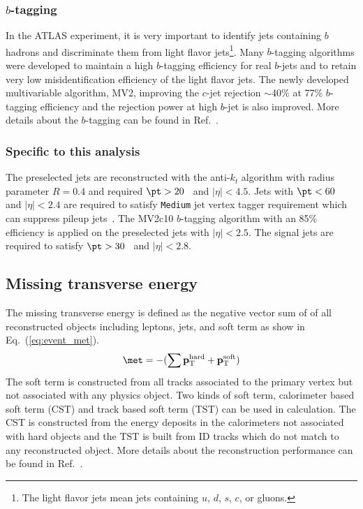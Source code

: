 
\subsubsection{$b$-tagging}
\label{subsubsec:event_bjets}
In the ATLAS experiment, it is very important to identify jets containing $b$ hadrons and discriminate them from light flavor jets\footnote{The light flavor jets mean jets containing $u$, $d$, $s$, $c$, or gluons.}.
Many $b$-tagging algorithms were developed to maintain a high $b$-tagging efficiency for real $b$-jets and to retain very low misidentification efficiency of the light flavor jets.
The newly developed multivariable algorithm, MV2, improving the $c$-jet rejection $\sim$40\% at 77\% $b$-tagging efficiency and the rejection power at high $b$-jet \pt is also improved.
More details about the $b$-tagging can be found in Ref.~\cite{ATL-PHYS-PUB-2015-022, ATL-PHYS-PUB-2016-012}.


\subsubsection{Specific to this analysis}
\label{subsubsec:event_jets_specific}
The preselected jets are reconstructed with the anti-$k_{t}$ algorithm with radius parameter $R = 0.4$ and required $\pt > 20$~{\GeV} and $|\eta| < 4.5$.
Jets with $\pt < 60$~{\GeV} and $|\eta| < 2.4$ are required to satisfy \texttt{Medium} jet vertex tagger requirement which can suppress pileup jets~\cite{Aad:2015ina}.
The MV2c10 $b$-tagging algorithm with an 85\% efficiency is applied on the preselected jets with $|\eta| < 2.5$.
The signal jets are required to satisfy $\pt > 30$~{\GeV} and $|\eta| < 2.8$.


\subsection{Missing transverse energy}
\label{subsec:event_met}
The missing transverse energy \met is defined as the negative vector sum of \pt of all reconstructed objects including leptons, jets, and soft term as show in Eq.~(\ref{eq:event_met}).
%
\begin{equation}
    \met = - (\sum \mathbf{p}_{\mathrm{T}}^{\mathrm{hard}} + \mathbf{p}_{\mathrm{T}}^{\mathrm{soft}})
    \label{eq:event_met}
\end{equation}
%
The soft term is constructed from all tracks associated to the primary vertex but not associated with any physics object.
Two kinds of soft term, calorimeter based soft term (CST) and track based soft term (TST) can be used in \met calculation.
The CST \met is constructed from the energy deposits in the calorimeters not associated with hard objects and the TST \met is built from ID tracks which do not match to any reconstructed object.
More details about the \met reconstruction performance can be found in Ref.~\cite{ATL-PHYS-PUB-2015-023}.

